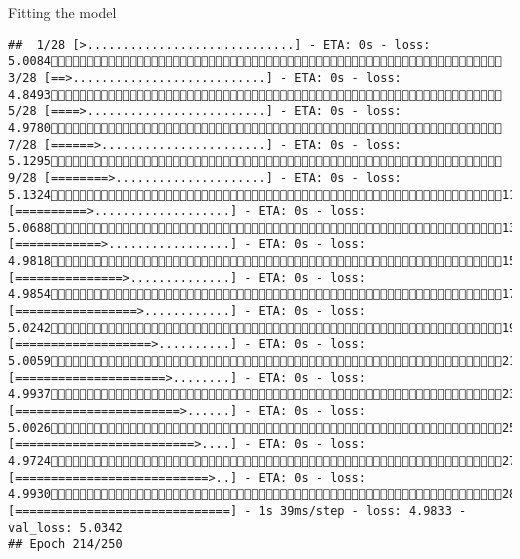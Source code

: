 \documentclass[
  ignorenonframetext,
]{beamer}
\begin{document}
\begin{frame}[fragile]{Fitting the model}
\begin{verbatim}
##  1/28 [>.............................] - ETA: 0s - loss: 5.0084 3/28 [==>...........................] - ETA: 0s - loss: 4.8493 5/28 [====>.........................] - ETA: 0s - loss: 4.9780 7/28 [======>.......................] - ETA: 0s - loss: 5.1295 9/28 [========>.....................] - ETA: 0s - loss: 5.132411/28 [==========>...................] - ETA: 0s - loss: 5.068813/28 [============>.................] - ETA: 0s - loss: 4.981815/28 [===============>..............] - ETA: 0s - loss: 4.985417/28 [=================>............] - ETA: 0s - loss: 5.024219/28 [===================>..........] - ETA: 0s - loss: 5.005921/28 [=====================>........] - ETA: 0s - loss: 4.993723/28 [=======================>......] - ETA: 0s - loss: 5.002625/28 [=========================>....] - ETA: 0s - loss: 4.972427/28 [===========================>..] - ETA: 0s - loss: 4.993028/28 [==============================] - 1s 39ms/step - loss: 4.9833 - val_loss: 5.0342
## Epoch 214/250

\end{verbatim}
\end{frame}
\end{document}
